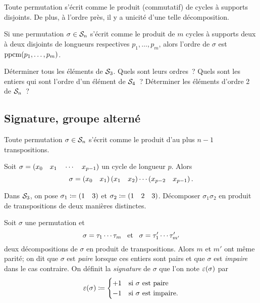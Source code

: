\documentclass{magnolia}
\begin{document}
\begin{theoreme}
Toute permutation s'écrit comme le produit (commutatif) de cycles à supports
disjoints. De plus, à l'ordre près, il y a unicité d'une telle décomposition.
\end{theoreme}

\begin{remarqueUnique}
\remarque Si une permutation $\sigma\in\mathcal{S}_{n}$ s'écrit comme le produit
  de $m$ cycles à supports deux à deux disjoints de longueurs respectives $p_1,\ldots,p_m$, alors l'ordre de
  $\sigma$ est $\operatorname{ppcm}(p_1,\ldots,p_m)$.  
\end{remarqueUnique}

\begin{exos}
\exo Déterminer tous les éléments de $\mathcal{S}_{3}$. Quels sont leurs ordres~?
\exo Quels sont les entiers qui sont l'ordre d'un élément de $\mathcal{S}_{4}$~?
\exo Déterminer les éléments d'ordre 2 de $\mathcal{S}_{n}$~?
\end{exos}

\subsection{Signature, groupe alterné}

\begin{proposition}
Toute permutation $\sigma\in\mathcal{S}_{n}$ s'écrit comme le produit d'au plus
$n-1$ transpositions.
\end{proposition}

\begin{remarqueUnique}
\remarque Soit $\sigma=\left(x_0 \quad x_1 \quad \cdots \quad x_{p-1}\right)$ un cycle de
  longueur $p$. Alors
  \[\sigma=\left(x_0 \quad x_1\right)\left(x_1 \quad x_2\right)\cdots\left(x_{p-2} \quad x_{p-1}\right).\]
\end{remarqueUnique}

\begin{exoUnique}
\exo Dans $\mathcal{S}_{3}$, on pose $\sigma_1\coloneqq\left(1\quad 3\right)$ et
  $\sigma_2\coloneqq\left(1\quad 2\quad 3\right)$. Décomposer $\sigma_1 \sigma_2$ en
  produit de transpositions de deux manières distinctes.
\end{exoUnique}

\begin{definition}
Soit $\sigma$ une permutation et
\[\sigma=\tau_1\cdots\tau_{m} \quad\!\text{et}\quad\! \sigma=\tau_1'\cdots\tau_{m'}'\]
deux décompositions de $\sigma$ en produit de transpositions.
Alors $m$ et $m'$ ont même parité; on dit que $\sigma$ est \emph{paire} lorsque ces entiers
sont pairs et que $\sigma$ est \emph{impaire} dans le cas contraire.
On définit la \emph{signature} de $\sigma$ que l'on note $\signat{\sigma}$ par
\[\signat{\sigma}\defeq
  \begin{cases}
  +1 & \text{si $\sigma$ est paire}\\
  -1 & \text{si $\sigma$ est impaire.}
  \end{cases}\]
\end{definition}
\end{document}
